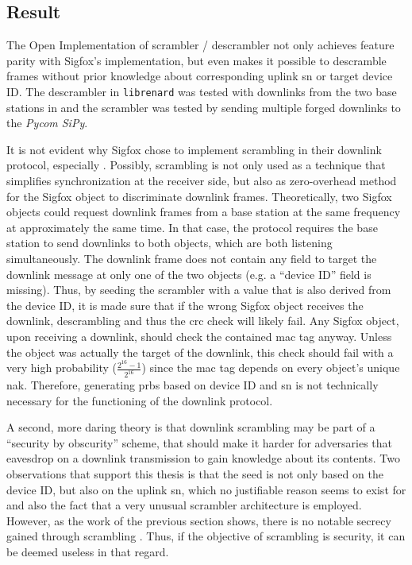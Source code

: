 \subsection{Result}
The Open Implementation of scrambler / descrambler not only achieves feature parity with Sigfox's implementation, but even makes it possible to descramble frames without prior knowledge about corresponding uplink \gls{sn} or target device ID.
The descrambler in \texttt{librenard} was tested with downlinks from the two base stations in  and the scrambler was tested by sending multiple forged downlinks to the \textit{Pycom SiPy}.

It is not evident why Sigfox chose to implement scrambling in their downlink protocol, especially .
Possibly, scrambling is not only used as a technique that simplifies synchronization at the receiver side, but also as zero-overhead method for the Sigfox object to discriminate downlink frames.
Theoretically, two Sigfox objects could request downlink frames from a base station at the same frequency at approximately the same time.
In that case, the protocol requires the base station to send downlinks to both objects, which are both listening simultaneously.
The downlink frame does not contain any field to target the downlink message at only one of the two objects (e.g. a ``device ID'' field is missing).
Thus, by seeding the scrambler with a value that is also derived from the device ID, it is made sure that if the wrong Sigfox object receives the downlink, descrambling and thus the \gls{crc} check will likely fail.
Any Sigfox object, upon receiving a downlink, should check the contained \gls{mac} tag anyway.
Unless the object was actually the target of the downlink, this check should fail with a very high probability ($\frac{2^{16} - 1}{2^{16}}$) since the \gls{mac} tag depends on every object's unique \gls{nak}.
Therefore, generating \gls{prbs} based on device ID and \gls{sn} is not technically necessary for the functioning of the downlink protocol.

A second, more daring theory is that downlink scrambling may be part of a ``security by obscurity'' scheme, that should make it harder for adversaries that eavesdrop on a downlink transmission to gain knowledge about its contents.
Two observations that support this thesis is that the seed is not only based on the device ID, but also on the uplink \gls{sn}, which no justifiable reason seems to exist for and also the fact that a very unusual scrambler architecture  is employed.
However, as the work of the previous section shows, there is no notable secrecy gained through scrambling .
Thus, if the objective of scrambling is security, it can be deemed useless in that regard.

